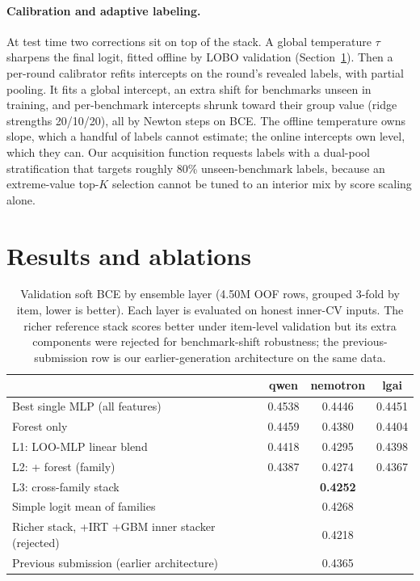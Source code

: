 \documentclass{article}
\begin{document}
\paragraph{Calibration and adaptive labeling.}
At test time two corrections sit on top of the stack. A global temperature $\tau$ sharpens the final logit, fitted offline by LOBO validation (Section~\ref{sec:results}). Then a per-round calibrator refits intercepts on the round's revealed labels, with partial pooling. It fits a global intercept, an extra shift for benchmarks unseen in training, and per-benchmark intercepts shrunk toward their group value (ridge strengths 20/10/20), all by Newton steps on BCE. The offline temperature owns slope, which a handful of labels cannot estimate; the online intercepts own level, which they can. Our acquisition function requests labels with a dual-pool stratification that targets roughly 80\% unseen-benchmark labels, because an extreme-value top-$K$ selection cannot be tuned to an interior mix by score scaling alone.

\section{Results and ablations}\label{sec:results}

\begin{table}[t]
\centering
\caption{Validation soft BCE by ensemble layer (4.50M OOF rows, grouped 3-fold by item, lower is better). Each layer is evaluated on honest inner-CV inputs. The richer reference stack scores better under item-level validation but its extra components were rejected for benchmark-shift robustness; the previous-submission row is our earlier-generation architecture on the same data.}
\label{tab:layers}
\begin{tabular}{lccc}
\toprule
 & qwen & nemotron & lgai \\
\midrule
Best single MLP (all features) & 0.4538 & 0.4446 & 0.4451 \\
Forest only & 0.4459 & 0.4380 & 0.4404 \\
L1: LOO-MLP linear blend & 0.4418 & 0.4295 & 0.4398 \\
L2: + forest (family) & 0.4387 & 0.4274 & 0.4367 \\
\midrule
L3: cross-family stack & \multicolumn{3}{c}{\textbf{0.4252}} \\
Simple logit mean of families & \multicolumn{3}{c}{0.4268} \\
Richer stack, +IRT +GBM inner stacker (rejected) & \multicolumn{3}{c}{0.4218} \\
Previous submission (earlier architecture) & \multicolumn{3}{c}{0.4365} \\
\bottomrule
\end{tabular}
\end{table}
\end{document}
